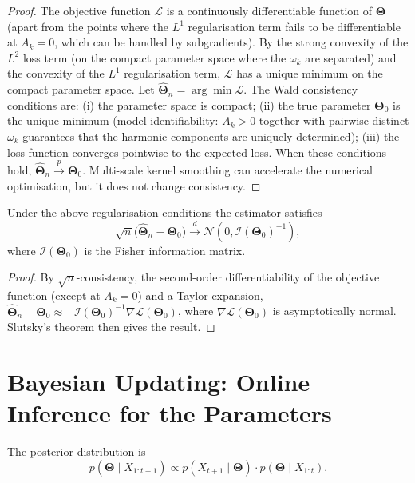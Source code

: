 \begin{proof}
The objective function $\mathcal{L}$ is a continuously differentiable function of $\boldsymbol{\Theta}$ (apart from the points where the $L^1$ regularisation term fails to be differentiable at $A_k = 0$, which can be handled by subgradients). By the strong convexity of the $L^2$ loss term (on the compact parameter space where the $\omega_k$ are separated) and the convexity of the $L^1$ regularisation term, $\mathcal{L}$ has a unique minimum on the compact parameter space. Let $\hat{\boldsymbol{\Theta}}_n = \arg\min \mathcal{L}$. The Wald consistency conditions are: (i) the parameter space is compact; (ii) the true parameter $\boldsymbol{\Theta}_0$ is the unique minimum (model identifiability: $A_k > 0$ together with pairwise distinct $\omega_k$ guarantees that the harmonic components are uniquely determined); (iii) the loss function converges pointwise to the expected loss. When these conditions hold, $\hat{\boldsymbol{\Theta}}_n \xrightarrow{p} \boldsymbol{\Theta}_0$. Multi-scale kernel smoothing can accelerate the numerical optimisation, but it does not change consistency.
\end{proof}

\begin{theorem}\label{thm:ts_harmonic_asymptotic}
Under the above regularisation conditions the estimator satisfies
\[
\sqrt{n}\bigl(\hat{\boldsymbol{\Theta}}_n-\boldsymbol{\Theta}_0\bigr)\xrightarrow{d}\mathcal{N}(0,\mathcal{I}(\boldsymbol{\Theta}_0)^{-1}),
\]
where $\mathcal{I}(\boldsymbol{\Theta}_0)$ is the Fisher information matrix.
\end{theorem}

\begin{proof}
By $\sqrt{n}$-consistency, the second-order differentiability of the objective function (except at $A_k=0$) and a Taylor expansion, $\hat{\boldsymbol{\Theta}}_n-\boldsymbol{\Theta}_0\approx-\mathcal{I}(\boldsymbol{\Theta}_0)^{-1}\nabla\mathcal{L}(\boldsymbol{\Theta}_0)$, where $\nabla\mathcal{L}(\boldsymbol{\Theta}_0)$ is asymptotically normal. Slutsky's theorem then gives the result.
\end{proof}

\section{Bayesian Updating: Online Inference for the Parameters}

\begin{definition}\label{def:ts_bayesian_update}
The posterior distribution is
\[
p(\boldsymbol{\Theta} \mid X_{1:t+1}) \propto p(X_{t+1} \mid \boldsymbol{\Theta}) \cdot p(\boldsymbol{\Theta} \mid X_{1:t}).
\]
\end{definition}

